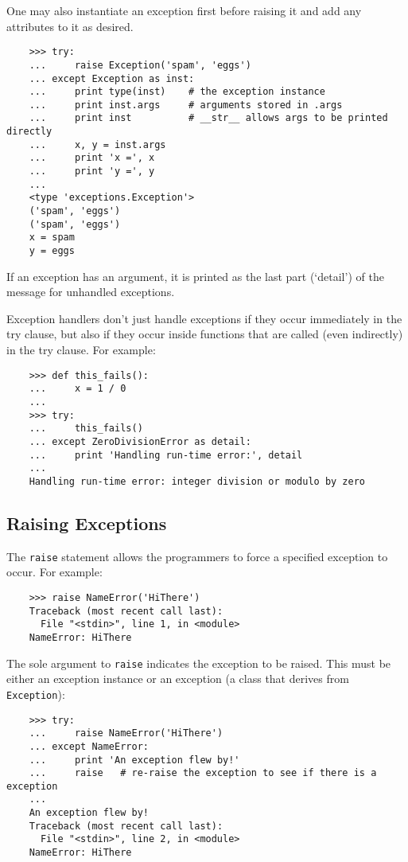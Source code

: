 \documentclass[UTF8]{article}
\begin{document}
One may also instantiate an exception first before raising it and add any attributes to it as
desired.
\begin{verbatim}
    >>> try:
    ...     raise Exception('spam', 'eggs')
    ... except Exception as inst:
    ...     print type(inst)    # the exception instance
    ...     print inst.args     # arguments stored in .args
    ...     print inst          # __str__ allows args to be printed directly
    ...     x, y = inst.args
    ...     print 'x =', x
    ...     print 'y =', y
    ...
    <type 'exceptions.Exception'>
    ('spam', 'eggs')
    ('spam', 'eggs')
    x = spam
    y = eggs
\end{verbatim}

If an exception has an argument, it is printed as the last part (`detail') of the message for
unhandled exceptions.

Exception handlers don't just handle exceptions if they occur immediately in the try clause, but
also if they occur inside functions that are called (even indirectly) in the try clause. For
example:
\begin{verbatim}
    >>> def this_fails():
    ...     x = 1 / 0
    ...
    >>> try:
    ...     this_fails()
    ... except ZeroDivisionError as detail:
    ...     print 'Handling run-time error:', detail
    ...
    Handling run-time error: integer division or modulo by zero
\end{verbatim}

\subsection{Raising Exceptions}
The \texttt{raise} statement allows the programmers to force a specified exception to
occur. For example:
\begin{verbatim}
    >>> raise NameError('HiThere')
    Traceback (most recent call last):
      File "<stdin>", line 1, in <module>
    NameError: HiThere
\end{verbatim}

The sole argument to \texttt{raise} indicates the exception to be raised. This must be
either an exception instance or an exception (a class that derives from \texttt{Exception}):
\begin{verbatim}
    >>> try:
    ...     raise NameError('HiThere')
    ... except NameError:
    ...     print 'An exception flew by!'
    ...     raise   # re-raise the exception to see if there is a exception
    ...
    An exception flew by!
    Traceback (most recent call last):
      File "<stdin>", line 2, in <module>
    NameError: HiThere
\end{verbatim}
\end{document}
